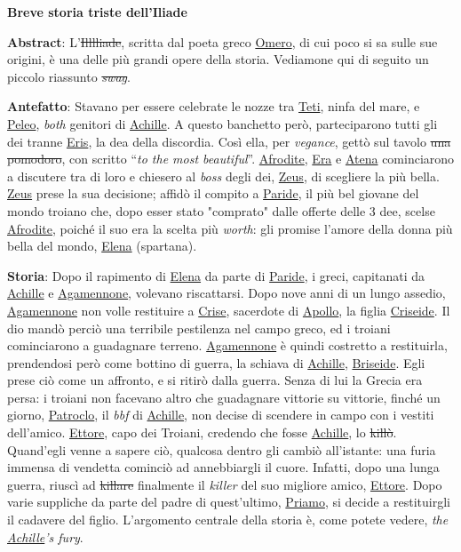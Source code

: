 \documentclass{article}
\begin{document}
\textbf{Breve storia triste dell’Iliade}

\textbf{Abstract}:
L'\sout{Illlliade}, scritta dal poeta greco \underline{Omero}, di cui poco si
sa sulle sue origini, è una delle più grandi opere della storia. Vediamone qui
di seguito un piccolo riassunto \sout{\textit{swag}}.

\textbf{Antefatto}:
Stavano per essere celebrate le nozze tra \underline{Teti}, ninfa del mare, e 
\underline{Peleo}, 
\textit{both} genitori di \underline{Achille}. A questo banchetto però,
parteciparono tutti gli dei tranne \underline{Eris}, la dea della discordia.
Così ella, per \textit{vegance}, gettò sul tavolo \sout{una pomodoro}, con
scritto ``\textit{to the most beautiful}''. \underline{Afrodite}, 
\underline{Era}
e \underline{Atena} cominciarono a discutere tra di loro e chiesero al 
\textit{boss} degli dei, \underline{Zeus}, di scegliere la più bella.
\underline{Zeus} prese la sua decisione; affidò il compito a 
\underline{Paride}, il più bel giovane del mondo troiano che, dopo esser stato
"comprato" dalle offerte delle 3 dee, scelse \underline{Afrodite}, poiché il
suo era la scelta più \textit{worth}: gli promise l'amore della donna più bella
del mondo, \underline{Elena} (spartana).

\textbf{Storia}:
Dopo il rapimento di \underline{Elena} da parte di \underline{Paride}, i greci,
capitanati da \underline{Achille} e \underline{Agamennone}, volevano
riscattarsi. Dopo nove anni di un lungo assedio, \underline{Agamennone} non
volle restituire a \underline{Crise}, sacerdote di \underline{Apollo}, la figlia
\underline{Criseide}. Il dio mandò perciò una terribile pestilenza nel campo
greco, ed i troiani cominciarono a guadagnare terreno. \underline{Agamennone} è
quindi costretto a restituirla, prendendosi però come bottino di guerra, la
schiava di \underline{Achille},
\underline{Briseide}. Egli prese ciò come un affronto, e si ritirò dalla
guerra. Senza di lui la Grecia era persa: i troiani non facevano altro che
guadagnare vittorie su vittorie, finché un giorno, \underline{Patroclo}, il 
\textit{bbf} di \underline{Achille}, non decise di scendere in campo con i
vestiti dell'amico. \underline{Ettore}, capo dei Troiani, credendo che fosse 
\underline{Achille}, lo \sout{killò}. Quand'egli venne a sapere ciò, qualcosa
dentro gli cambiò all'istante: una furia immensa di vendetta cominciò ad
annebbiargli il cuore. Infatti, dopo una lunga guerra, riuscì ad \sout{killare}
finalmente il \textit{killer} del suo migliore amico, \underline{Ettore}. Dopo
varie suppliche da parte del padre di quest'ultimo, \underline{Priamo}, si
decide a restituirgli il cadavere del figlio. L'argomento centrale della storia
è, come potete vedere, \textit{the \underline{Achille}'s fury}.
\end{document}
